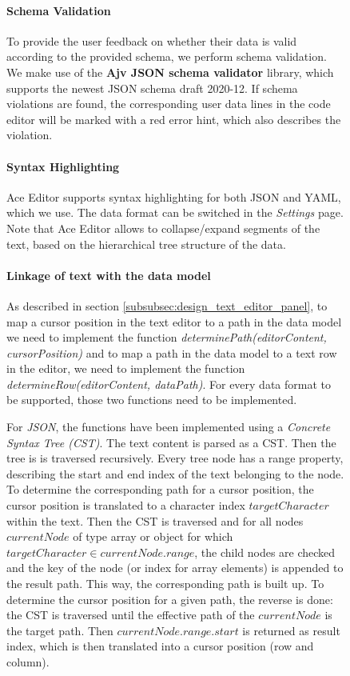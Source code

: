 \begin{figure}[h]
\paragraph{Schema Validation}
To provide the user feedback on whether their data is valid according to the provided schema, we perform schema validation.
We make use of the \textbf{Ajv JSON schema validator}\cite{ajv-validator} library, which supports the newest JSON schema draft 2020-12.
If schema violations are found, the corresponding user data lines in the code editor will be marked with a red error hint, which also describes the violation.


\paragraph{Syntax Highlighting}
Ace Editor supports syntax highlighting for both JSON and YAML, which we use.
The data format can be switched in the \textit{Settings} page.
Note that Ace Editor allows to collapse/expand segments of the text, based on the hierarchical tree structure of the data.

\paragraph{Linkage of text with the data model}
As described in section \ref{subsubsec:design_text_editor_panel}, to map a cursor position in the text editor to a path in the data model we need to implement the function \textit{determinePath(editorContent, cursorPosition)} and to map a path in the data model to a text row in the editor, we need to implement the function \textit{determineRow(editorContent, dataPath)}. For every data format to be supported, those two functions need to be implemented.

For \textit{JSON}, the functions have been implemented using a \textit{Concrete Syntax Tree (CST)}.
The text content is parsed as a CST. Then the tree is is traversed recursively.
Every tree node has a range property, describing the start and end index of the text belonging to the node.
To determine the corresponding path for a cursor position, the cursor position is translated to a character index $targetCharacter$ within the text.
Then the CST is traversed and for all nodes $currentNode$ of type array or object for which $targetCharacter \in currentNode.range$,
the child nodes are checked and the key of the node (or index for array elements) is appended to the result path.
This way, the corresponding path is built up. To determine the cursor position for a given path, the reverse is done: the CST is traversed until the effective path of the $currentNode$ is the target path. Then $currentNode.range.start$ is returned as result index, which is then translated into a cursor position (row and column).


\end{figure}
